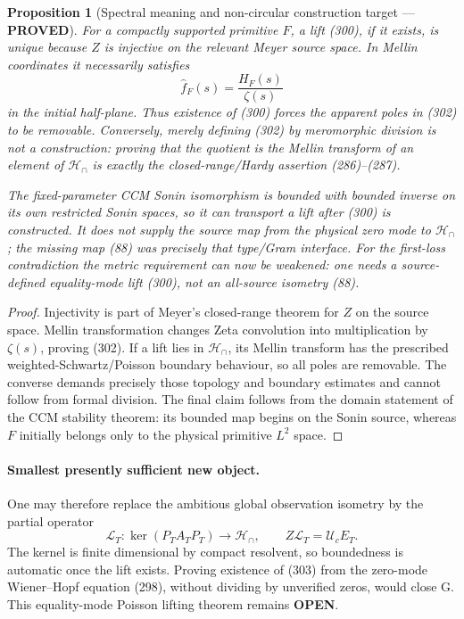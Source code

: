 \documentclass[11pt]{article}
\newtheorem{proposition}[theorem]{Proposition}
\newcommand{\PROVED}{\textcolor{green!45!black}{\textbf{PROVED}}}
\newcommand{\OPEN}{\textcolor{red!70!black}{\textbf{OPEN}}}
\begin{document}
\begin{proposition}[Spectral meaning and non-circular construction target ---
\PROVED]
For a compactly supported primitive $F$, a lift (300), if it exists, is
unique because $Z$ is injective on the relevant Meyer source space.  In
Mellin coordinates it necessarily satisfies
\begin{equation}
 \widehat f_F(s)=\frac{H_F(s)}{\zeta(s)}               \tag{302}
\end{equation}
in the initial half-plane.  Thus existence of (300) forces the apparent
poles in (302) to be removable.  Conversely, merely defining (302) by
meromorphic division is not a construction: proving that the quotient is
the Mellin transform of an element of $\mathcal H_\cap$ is exactly the
closed-range/Hardy assertion (286)--(287).

The fixed-parameter CCM Sonin isomorphism is bounded with bounded inverse on
its own restricted Sonin spaces, so it can transport a lift after (300) is
constructed.  It does not supply the source map from the physical zero mode
to $\mathcal H_\cap$; the missing map (88) was precisely that type/Gram
interface.  For the first-loss contradiction the metric requirement can now
be weakened: one needs a source-defined equality-mode lift (300), not an
all-source isometry (88).
\end{proposition}

\begin{proof}
Injectivity is part of Meyer's closed-range theorem for $Z$ on the source
space.  Mellin transformation changes Zeta convolution into multiplication
by $\zeta(s)$, proving (302).  If a lift lies in $\mathcal H_\cap$, its Mellin
transform has the prescribed weighted-Schwartz/Poisson boundary behaviour,
so all poles are removable.  The converse demands precisely those topology
and boundary estimates and cannot follow from formal division.  The final
claim follows from the domain statement of the CCM stability theorem: its
bounded map begins on the Sonin source, whereas $F$ initially belongs only
to the physical primitive $L^2$ space.
\end{proof}

\paragraph{Smallest presently sufficient new object.}
One may therefore replace the ambitious global observation isometry by the
partial operator
\begin{equation}
 \mathcal L_T:\ker(P_TA_TP_T)\longrightarrow\mathcal H_\cap,
 \qquad Z\mathcal L_T=\mathcal U_cE_T.                \tag{303}
\end{equation}
The kernel is finite dimensional by compact resolvent, so boundedness is
automatic once the lift exists.  Proving existence of (303) from the
zero-mode Wiener--Hopf equation (298), without dividing by unverified zeros,
would close G.  This equality-mode Poisson lifting theorem remains \OPEN{}.
\end{document}
